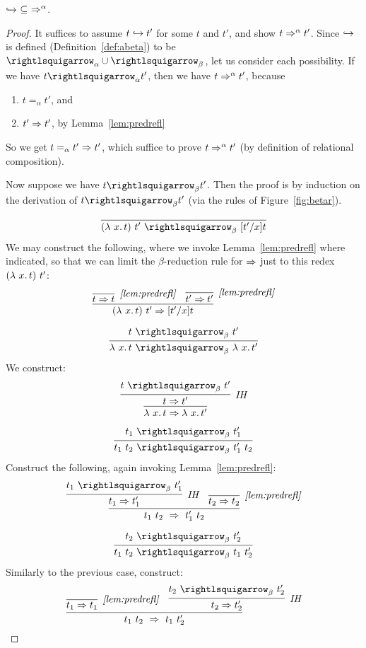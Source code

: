\begin{lemma}
  \label{lem:betapar}
  $\hookrightarrow\ \subseteq\ \Rightarrow^\alpha$.
\end{lemma}
\begin{proof}
  It suffices to assume $t \hookrightarrow t'$ for some $t$ and $t'$,
  and show $t \Rightarrow^\alpha t'$.  Since $\hookrightarrow$ is defined (Definition~\ref{def:abeta}) to be $\curva_\alpha \cup \curva_\beta$,
  let us consider each possibility.  If we have $t \curva_\alpha t'$, then we have $t \Rightarrow^\alpha t'$, because 
  \begin{enumerate}
  \item $t =_\alpha t'$, and
  \item $t' \Rightarrow t'$, by Lemma~\ref{lem:predrefl}
  \end{enumerate}
  \noindent So we get $t =_\alpha t' \Rightarrow t'$, which suffice to prove $t \Rightarrow^\alpha t'$ (by definition of relational composition).

  Now suppose we have $t \curva_\beta t'$.  Then the proof is by
  induction on the derivation of $t \curva_\beta t'$ (via the rules of
  Figure~\ref{fig:betar}).

  \case{ }
  \[
  \infer{(\lam{x}{t})\ t'\ \curva_\beta\ [t'/x]t}{\ }
  \]
  \noindent We may construct the following, where we invoke Lemma~\ref{lem:predrefl} where indicated, so that we can limit
  the $\beta$-reduction rule for $\Rightarrow$ just to this redex $(\lambda\ x.\, t)\ t'$:
  \[
  \infer{(\lam{x}{t})\ t' \Pred [t'/x]t}
        {\infer[\textit{\ref{lem:predrefl}}]{t \Pred t}{\ } & \infer[\textit{\ref{lem:predrefl}}]{t' \Pred t'}{\ }}
  \]
        

  \case{ }
  \[
  \infer{\lam{x}{t}\ \curva_\beta\ \lam{x}{t'}}{t\ \curva_\beta\ t'}
  \]
  \noindent We construct:
  \[
  \infer{\lam{x}{t} \Pred \lam{x}{t'}}{\infer[\textit{IH}]{t \Pred t'}{t\ \curva_\beta\ t'}}
  \]

  \case{ }
  \[
  \infer{t_1\ t_2\ \curva_\beta\ t_1'\ t_2}{t_1\ \curva_\beta\ t_1'}
  \]
  \noindent Construct the following, again invoking Lemma~\ref{lem:predrefl}:
  \[
  \infer{t_1\ t_2\ \Pred\ t_1'\ t_2}{\infer[\textit{IH}]{t_1 \Pred t_1'}{t_1\ \curva_\beta\ t_1'} &
                                    \infer[\textit{\ref{lem:predrefl}}]{t_2 \Pred t_2}{\ }}
  \]

  \case{ }
  \[
  \infer{t_1\ t_2\ \curva_\beta\ t_1\ t_2'}{t_2\ \curva_\beta\ t_2'}
  \]
  \noindent Similarly to the previous case, construct:
  \[
  \infer{t_1\ t_2\ \Pred\ t_1\ t_2'}{\infer[\textit{\ref{lem:predrefl}}]{t_1 \Pred t_1}{\ }&
                                    \infer[\textit{IH}]{t_2 \Pred t_2'}{t_2\ \curva_\beta\ t_2'} }
  \]
  
        
  \end{proof}

